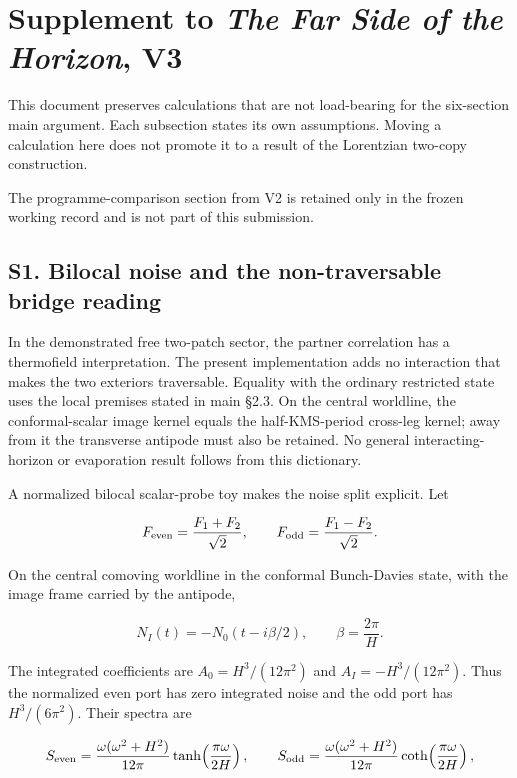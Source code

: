 \documentclass[
]{article}
\author{}
\date{}
\begin{document}
\section{\texorpdfstring{Supplement to \emph{The Far Side of the
Horizon},
V3}{Supplement to The Far Side of the Horizon, V3}}\label{supplement-to-the-far-side-of-the-horizon-v3}

This document preserves calculations that are not load-bearing for the
six-section main argument. Each subsection states its own assumptions.
Moving a calculation here does not promote it to a result of the
Lorentzian two-copy construction.

The programme-comparison section from V2 is retained only in the frozen
working record and is not part of this submission.

\subsection{S1. Bilocal noise and the non-traversable bridge
reading}\label{s1.-bilocal-noise-and-the-non-traversable-bridge-reading}

In the demonstrated free two-patch sector, the partner correlation has a
thermofield interpretation. The present implementation adds no
interaction that makes the two exteriors traversable. Equality with the
ordinary restricted state uses the local premises stated in main §2.3.
On the central worldline, the conformal-scalar image kernel equals the
half-KMS-period cross-leg kernel; away from it the transverse antipode
must also be retained. No general interacting-horizon or evaporation
result follows from this dictionary.

A normalized bilocal scalar-probe toy makes the noise split explicit.
Let

\[
F_{\rm even}=\frac{F_1+F_2}{\sqrt2},\qquad
F_{\rm odd}=\frac{F_1-F_2}{\sqrt2}.
\]

On the central comoving worldline in the conformal Bunch-Davies state,
with the image frame carried by the antipode,

\[
N_I(t)=-N_0(t-i\beta/2),\qquad \beta=\frac{2\pi}{H}.
\]

The integrated coefficients are \(A_0=H^3/(12\pi^2)\) and
\(A_I=-H^3/(12\pi^2)\). Thus the normalized even port has zero
integrated noise and the odd port has \(H^3/(6\pi^2)\). Their spectra
are

\[
S_{\rm even}=\frac{\omega(\omega^2+H^2)}{12\pi}
\tanh\!\left(\frac{\pi\omega}{2H}\right),\qquad
S_{\rm odd}=\frac{\omega(\omega^2+H^2)}{12\pi}
\coth\!\left(\frac{\pi\omega}{2H}\right),
\]
\end{document}
